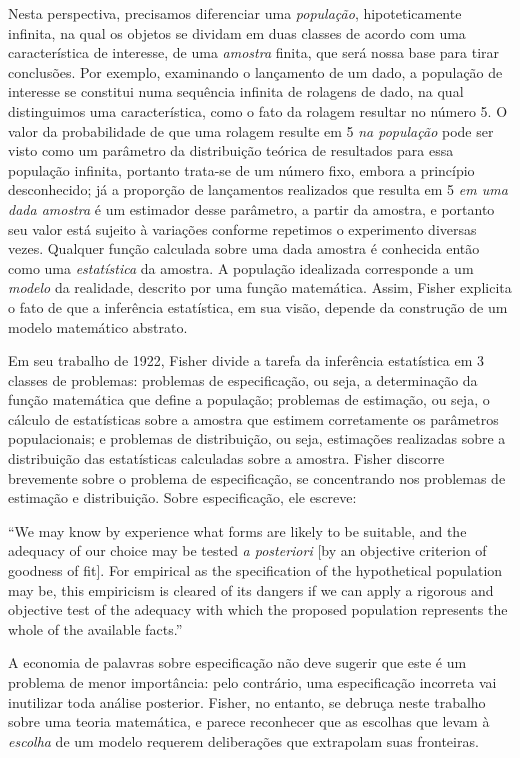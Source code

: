 Nesta perspectiva, precisamos diferenciar uma {\em população}, hipoteticamente infinita, na qual os objetos se dividam em duas
classes de acordo com uma característica de interesse, de uma {\em amostra} finita, que será nossa base para tirar conclusões.
Por exemplo, examinando o lançamento de um dado, a população de interesse se constitui numa sequência infinita de rolagens
de dado, na qual distinguimos uma característica, como o fato da rolagem resultar no número 5. O valor da probabilidade de que
uma rolagem resulte em 5 {\em na população} pode ser visto como um parâmetro da distribuição teórica de resultados para essa
população infinita, portanto trata-se de um número fixo, embora a princípio desconhecido; 
já a proporção de lançamentos realizados que resulta em 5 {\em em uma dada amostra} é um estimador desse parâmetro,
a partir da amostra, e portanto seu valor está sujeito à variações conforme repetimos o experimento diversas vezes.
Qualquer função calculada sobre uma dada amostra é conhecida então como uma {\em estatística} da amostra.
A população idealizada corresponde a um {\em modelo} da realidade, descrito por uma função matemática.
Assim, Fisher explicita o fato de que a inferência estatística, em sua visão, depende da construção de um modelo matemático
abstrato.

Em seu trabalho de 1922, Fisher divide a tarefa da inferência estatística em 3 classes de 
problemas: problemas de especificação, ou seja, a determinação da função
matemática que define a população; problemas de estimação, ou seja, o cálculo de estatísticas sobre a amostra que estimem 
corretamente os parâmetros populacionais; e problemas de distribuição, ou seja, estimações realizadas sobre a distribuição
das estatísticas calculadas sobre a amostra. Fisher discorre brevemente sobre o problema de especificação,
se concentrando nos problemas de estimação e distribuição. Sobre especificação, ele escreve:

``We may know by experience what forms are likely to be suitable, and the adequacy of our choice may be
tested {\em a posteriori} [by an objective criterion of goodness of fit].
For empirical as the specification of the hypothetical population may be, this empiricism is cleared of its dangers if
we can apply a rigorous and objective test of the adequacy with which the proposed population represents the whole of
the available facts.''\citep{Fisher1922}

A economia de palavras sobre especificação não deve sugerir que este é um problema de menor importância: pelo contrário,
uma especificação incorreta vai inutilizar toda análise posterior. Fisher, no entanto, se debruça neste trabalho sobre
uma teoria matemática, e parece reconhecer que as escolhas que levam à {\em escolha} de um modelo requerem deliberações
que extrapolam suas fronteiras.

